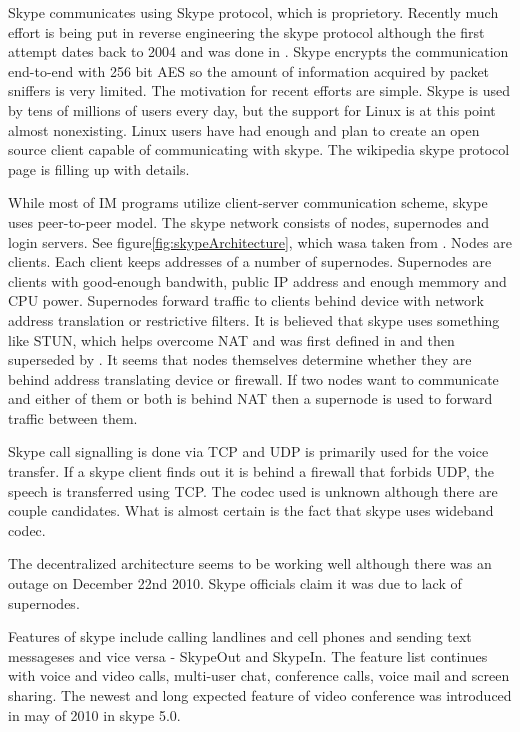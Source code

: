 Skype communicates using Skype protocol, which is proprietory. Recently much effort is being put in reverse engineering the skype protocol although the first attempt dates back to 2004 and was done in \cite{skypeProtocolAnalysis}. Skype encrypts the communication end-to-end with 256 bit AES so the amount of information acquired by packet sniffers is very limited. The motivation for recent efforts are simple. Skype is used by tens of millions of users every day, but the support for Linux is at this point almost nonexisting. Linux users have had enough and plan to create an open source client capable of communicating with skype. The wikipedia skype protocol page\cite{wikipediaSkypeProtocol} is filling up with details.  

While most of IM programs utilize client-server communication scheme, skype uses peer-to-peer model. The skype network consists of nodes, supernodes and login servers. See figure\ref{fig:skypeArchitecture}, which wasa taken from \cite{skypeProtocolAnalysis}. Nodes are clients. Each client keeps addresses of a number of supernodes. Supernodes are clients with good-enough bandwith, public IP address and enough memmory and CPU power. Supernodes forward traffic to clients behind device with network address translation or restrictive filters. It is believed that skype uses something like STUN, which helps overcome NAT and was first defined in \cite{STUNRFC} and then superseded by \cite{STUNRFCNEW}. It seems that nodes themselves determine whether they are behind address translating device or firewall. If two nodes want to communicate and either of them or both is behind NAT then a supernode is used to forward traffic between them. 

Skype call signalling is done via TCP and UDP is primarily used for the voice transfer. If a skype client finds out it is behind a firewall that forbids UDP, the speech is transferred using TCP. The codec used is unknown although there are couple candidates. What is almost certain is the fact that skype uses wideband codec. 

The decentralized architecture seems to be working well although there was an outage on December 22nd 2010. Skype officials claim it was due to lack of supernodes\cite{skypeOutage}.  


Features of skype include calling landlines and cell phones and sending text messageses and vice versa - SkypeOut and SkypeIn. The feature list continues with voice and video calls, multi-user chat, conference calls, voice mail and screen sharing. The newest and long expected feature of video conference was introduced in may of 2010 in skype 5.0. 

